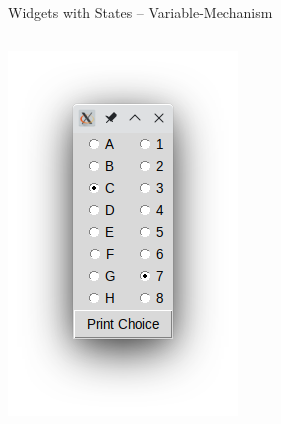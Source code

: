 \begin{frame}[fragile]{Widgets with States -- Variable-Mechanism}
\begin{columns}[T]
\includegraphics[width=\linewidth]{./gfx/12-tk-radiobuttons}
\end{columns}
%
\end{frame}


